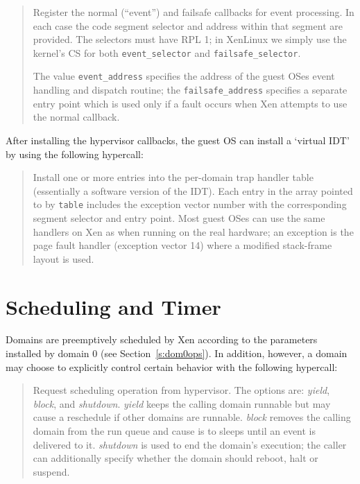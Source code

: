 \begin{quote}

Register the normal (``event'') and failsafe callbacks for 
event processing. In each case the code segment selector and 
address within that segment are provided. The selectors must
have RPL 1; in XenLinux we simply use the kernel's CS for both 
{\tt event\_selector} and {\tt failsafe\_selector}.

The value {\tt event\_address} specifies the address of the guest OSes
event handling and dispatch routine; the {\tt failsafe\_address}
specifies a separate entry point which is used only if a fault occurs
when Xen attempts to use the normal callback. 
\end{quote} 


After installing the hypervisor callbacks, the guest OS can 
install a `virtual IDT' by using the following hypercall: 

\begin{quote} 

Install one or more entries into the per-domain 
trap handler table (essentially a software version of the IDT). 
Each entry in the array pointed to by {\tt table} includes the 
exception vector number with the corresponding segment selector 
and entry point. Most guest OSes can use the same handlers on 
Xen as when running on the real hardware; an exception is the 
page fault handler (exception vector 14) where a modified 
stack-frame layout is used. 


\end{quote} 



\section{Scheduling and Timer}

Domains are preemptively scheduled by Xen according to the 
parameters installed by domain 0 (see Section~\ref{s:dom0ops}). 
In addition, however, a domain may choose to explicitly 
control certain behavior with the following hypercall: 

\begin{quote} 

Request scheduling operation from hypervisor. The options are: {\it
yield}, {\it block}, and {\it shutdown}.  {\it yield} keeps the
calling domain runnable but may cause a reschedule if other domains
are runnable.  {\it block} removes the calling domain from the run
queue and cause is to sleeps until an event is delivered to it.  {\it
shutdown} is used to end the domain's execution; the caller can
additionally specify whether the domain should reboot, halt or
suspend.
\end{quote} 


